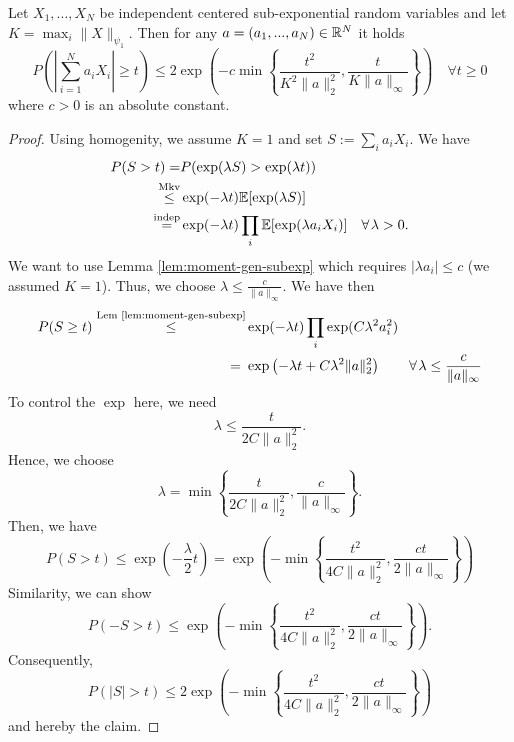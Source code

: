 \begin{prop}
\begin{mdframed}
Let $X_1,...,X_N$ be independent centered sub-exponential random variables and let $K= \max_i \|X\|_{\psi_1}$. Then for any $a=(a_1,...,a_N)\in \mathbb{R}^N$ it holds
\begin{equation*}
P\left(
\left| \sum_{i=1}^N a_i X_i
\right| \geq t \right) \leq 2 \exp \left(
-c \min \left\{
\frac{t^2}{K^2 \|a\|_2^2}, \frac{t}{K\|a\|_\infty}
\right\}
\right) \quad 
\forall t \geq 0
\end{equation*}
where $c>0$ is an absolute constant.
\end{mdframed}
\begin{proof}
Using homogenity, we assume $K=1$ and set $S:=\sum_i a_iX_i$. We have
\begin{equation*}
\begin{split}
P(S>t) = & P(\exp(\lambda S) > \exp (\lambda t)) \\
\overset{\text{Mkv}}\leq & \exp(-\lambda t) \E [\exp(\lambda S)]	\\
\overset{\text{indep}}= & \exp(-\lambda t) \prod_i \E[\exp(\lambda a_i X_i)]\quad \forall \lambda>0.
\end{split}
\end{equation*}
We want to use Lemma \ref{lem:moment-gen-subexp} which requires $|\lambda a_i| \leq c$ (we assumed $K=1$). Thus, we choose 
$\lambda\leq \frac{c}{\|a\|_\infty}$.  We have then
\begin{equation*}
\begin{split}
P(S\geq t) \overset{\text{Lem \ref{lem:moment-gen-subexp}}}{\leq} & \exp(-\lambda t) \prod_i  \exp(C\lambda^2a_i^2) \\
= \ & \exp\left(
-\lambda t + C \lambda^2 \|a\|_2^2
\right)\quad \quad	\forall \lambda\leq\frac{c}{\|a\|_\infty}
\end{split}
\end{equation*}
To control the $\exp$ here, we need $$
\lambda \leq \frac{t}{2C\|a\|_2^2}.
$$
Hence, we choose
$$\lambda = \min\left\{
\frac{t}{2C\|a\|_2^2} , \frac{c}{\|a\|_\infty}
\right\}.$$
Then, we have
\begin{equation*}
P(S>t) \leq \exp\left( -\frac{\lambda}{2}t  \right) = \exp\left(-\min\left\{
\frac{t^2}{4C\|a\|_2^2} , \frac{ct}{2\|a\|_\infty}
\right\}\right)
\end{equation*}
Similarity, we can show
$$P(-S>t) \leq \exp\left(-\min\left\{
\frac{t^2}{4C\|a\|_2^2} , \frac{ct}{2\|a\|_\infty}
\right\}\right).$$
Consequently,
$$P(|S|>t) \leq 2\exp\left(-\min\left\{
\frac{t^2}{4C\|a\|_2^2} , \frac{ct}{2\|a\|_\infty}
\right\}\right)$$
and hereby the claim.
\end{proof}
\end{prop}


